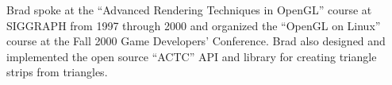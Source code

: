 \documentclass{acmsiggraph}
\begin{document}
Brad spoke at the ``Advanced Rendering Techniques in OpenGL'' course at
SIGGRAPH from 1997 through 2000 and organized the ``OpenGL on Linux''
course at the Fall 2000 Game Developers' Conference.
Brad also designed and implemented the open source
``ACTC'' API and library for creating triangle strips from triangles.



\nocite{*}

\end{document}
